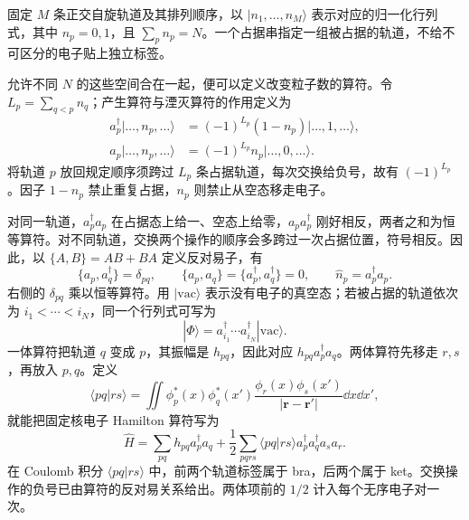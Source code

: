 固定 $M$ 条正交自旋轨道及其排列顺序，以
$|n_1,\ldots,n_M\rangle$ 表示对应的归一化行列式，其中 $n_p=0,1$，且 $\sum_p n_p=N$。一个占据串指定一组被占据的轨道，不给不可区分的电子贴上独立标签。

允许不同 $N$ 的这些空间合在一起，便可以定义改变粒子数的算符。令 $L_p=\sum_{q<p}n_q$；产生算符与湮灭算符的作用定义为
\begin{align}
a_p^\dagger|\ldots,n_p,\ldots\rangle
&=(-1)^{L_p}(1-n_p)|\ldots,1,\ldots\rangle,\\
a_p|\ldots,n_p,\ldots\rangle
&=(-1)^{L_p}n_p|\ldots,0,\ldots\rangle.
\end{align}
将轨道 $p$ 放回规定顺序须跨过 $L_p$ 条占据轨道，每次交换给负号，故有 $(-1)^{L_p}$。因子 $1-n_p$ 禁止重复占据，$n_p$ 则禁止从空态移走电子。

对同一轨道，$a_p^\dagger a_p$ 在占据态上给一、空态上给零，$a_pa_p^\dagger$ 刚好相反，两者之和为恒等算符。对不同轨道，交换两个操作的顺序会多跨过一次占据位置，符号相反。因此，以 $\{A,B\}=AB+BA$ 定义反对易子，有
\begin{equation}
\{a_p,a_q^\dagger\}=\delta_{pq},\qquad
\{a_p,a_q\}=\{a_p^\dagger,a_q^\dagger\}=0,
\qquad \hat n_p=a_p^\dagger a_p.
\end{equation}
右侧的 $\delta_{pq}$ 乘以恒等算符。用 $|\mathrm{vac}\rangle$ 表示没有电子的真空态；若被占据的轨道依次为 $i_1<\cdots<i_N$，同一个行列式可写为
\begin{equation}
|\Phi\rangle=a_{i_1}^\dagger\cdots a_{i_N}^\dagger|\mathrm{vac}\rangle.
\end{equation}
一体算符把轨道 $q$ 变成 $p$，其振幅是 $h_{pq}$，因此对应 $h_{pq}a_p^\dagger a_q$。两体算符先移走 $r,s$，再放入 $p,q$。定义
\begin{equation}
\langle pq|rs\rangle=\iint\phi_p^*(x)\phi_q^*(x')
\frac{\phi_r(x)\phi_s(x')}{|\bm r-\bm r'|}\dd x\dd x',
\end{equation}
就能把固定核电子 Hamilton 算符写为
\begin{equation}\label{hf:hamiltonian-occupation}
\hat H=\sum_{pq}h_{pq}a_p^\dagger a_q
+\frac12\sum_{pqrs}\langle pq|rs\rangle a_p^\dagger a_q^\dagger a_s a_r.
\end{equation}
在 Coulomb 积分 $\langle pq|rs\rangle$ 中，前两个轨道标签属于 bra，后两个属于 ket。交换操作的负号已由算符的反对易关系给出。两体项前的 $1/2$ 计入每个无序电子对一次。

